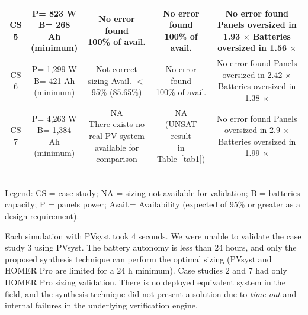 \documentclass[runningheads]{llncs}
\begin{document}
\begin{table}
\begin{scriptsize}
\begin{tabular}{c|c|c|c|c}
\hline
CS 5 & \makecell{P= 823 W\\B= 268 Ah\\(minimum)} & \makecell{No error found \\100\% of avail.} & \makecell{No error found \\100\% of avail.} & \makecell{No error found\\Panels oversized in 1.93 $\times$\\Batteries oversized in 1.56 $\times$}\\
\hline
CS 6 & \makecell{P= 1,299 W\\B= 421 Ah\\(minimum)} & \makecell{Not correct sizing \\Avail. $<$ 95\%\\(85.65\%)} & \makecell{No error found \\100\% of avail.} & \makecell{No error found\\Panels oversized in 2.42 $\times$\\Batteries oversized in 1.38 $\times$}\\
\hline
CS 7 & \makecell{P= 4,263 W\\B= 1,384 Ah\\(minimum)} & \makecell{NA\\There exists no real PV system\\available for comparison} & \makecell{NA \\(UNSAT result\\in Table~\ref{tab1})} & \makecell{No error found\\Panels oversized in 2.9 $\times$\\Batteries oversized in 1.99 $\times$}\\
\hline
\hline
\end{tabular}
\\Legend: CS = case study; NA = sizing not available for validation; B = batteries capacity; P = panels power; Avail.= Availability (expected of 95\% or greater as a design requirement).
\end{scriptsize}
\end{table}

Each simulation with PVsyst took $4$ seconds. We were unable to validate the case study $3$ using PVsyst. The battery autonomy is less than 24 hours, and only the proposed synthesis technique can perform the optimal sizing (PVsyst and HOMER Pro are limited for a $24$ h minimum). Case studies $2$ and $7$ had only HOMER Pro sizing validation. There is no deployed equivalent system in the field, and the synthesis technique did not present a solution due to \textit{time out} and internal failures in the underlying verification engine. %
\end{document}
